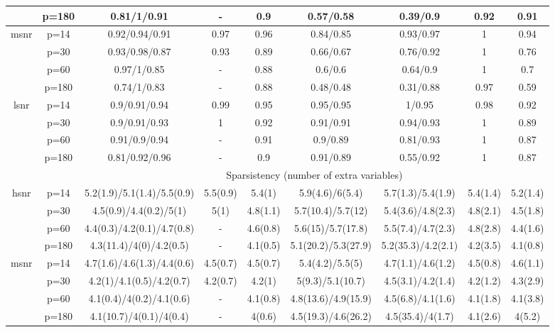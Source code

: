 \begin{table}[ht]
{\begin{tabular}{|c|c|ccccccc|}
   & p=180 & 0.81/1/0.91 & - & 0.9 & 0.57/0.58 & 0.39/0.9 & 0.92 & 0.91 \\ 
  \midrule\multirow{4}[2]{*}{msnr} & p=14 & 0.92/0.94/0.91 & 0.97 & 0.96 & 0.84/0.85 & 0.93/0.97 & 1 & 0.94 \\ 
   & p=30 & 0.93/0.98/0.87 & 0.93 & 0.89 & 0.66/0.67 & 0.76/0.92 & 1 & 0.76 \\ 
   & p=60 & 0.97/1/0.85 & - & 0.88 & 0.6/0.6 & 0.64/0.9 & 1 & 0.7 \\ 
   & p=180 & 0.74/1/0.83 & - & 0.88 & 0.48/0.48 & 0.31/0.88 & 0.97 & 0.59 \\ 
  \midrule\multirow{4}[2]{*}{lsnr} & p=14 & 0.9/0.91/0.94 & 0.99 & 0.95 & 0.95/0.95 & 1/0.95 & 0.98 & 0.92 \\ 
   & p=30 & 0.9/0.91/0.93 & 1 & 0.92 & 0.91/0.91 & 0.94/0.93 & 1 & 0.89 \\ 
   & p=60 & 0.91/0.9/0.94 & - & 0.91 & 0.9/0.89 & 0.81/0.93 & 1 & 0.87 \\ 
   & p=180 & 0.81/0.92/0.96 & - & 0.9 & 0.91/0.89 & 0.55/0.92 & 1 & 0.87 \\ 
   \midrule 
 \multicolumn{1}{|c}{} &       & \multicolumn{7}{c|}{Sparsistency (number of extra variables)} \\
\midrule\multirow{4}[2]{*}{hsnr} & p=14 & 5.2(1.9)/5.1(1.4)/5.5(0.9) & 5.5(0.9) & 5.4(1) & 5.9(4.6)/6(5.4) & 5.7(1.3)/5.4(1.9) & 5.4(1.4) & 5.2(1.4) \\ 
   & p=30 & 4.5(0.9)/4.4(0.2)/5(1) & 5(1) & 4.8(1.1) & 5.7(10.4)/5.7(12) & 5.4(3.6)/4.8(2.3) & 4.8(2.1) & 4.5(1.8) \\ 
   & p=60 & 4.4(0.3)/4.2(0.1)/4.7(0.8) & - & 4.6(0.8) & 5.6(15)/5.7(17.8) & 5.5(7.4)/4.7(2.3) & 4.8(2.8) & 4.4(1.6) \\ 
   & p=180 & 4.3(11.4)/4(0)/4.2(0.5) & - & 4.1(0.5) & 5.1(20.2)/5.3(27.9) & 5.2(35.3)/4.2(2.1) & 4.2(3.5) & 4.1(0.8) \\ 
  \midrule\multirow{4}[2]{*}{msnr} & p=14 & 4.7(1.6)/4.6(1.3)/4.4(0.6) & 4.5(0.7) & 4.5(0.7) & 5.4(4.2)/5.5(5) & 4.7(1.1)/4.6(1.2) & 4.5(0.8) & 4.6(1.1) \\ 
   & p=30 & 4.2(1)/4.1(0.5)/4.2(0.7) & 4.2(0.7) & 4.2(1) & 5(9.3)/5.1(10.7) & 4.5(3.1)/4.2(1.4) & 4.2(1.2) & 4.3(2.9) \\ 
   & p=60 & 4.1(0.4)/4(0.2)/4.1(0.6) & - & 4.1(0.8) & 4.8(13.6)/4.9(15.9) & 4.5(6.8)/4.1(1.6) & 4.1(1.8) & 4.1(3.8) \\ 
   & p=180 & 4.1(10.7)/4(0.1)/4(0.4) & - & 4(0.6) & 4.5(19.3)/4.6(26.2) & 4.5(35.4)/4(1.7) & 4.1(2.6) & 4(5.2) \\ 

\end{tabular}}
\end{table}
